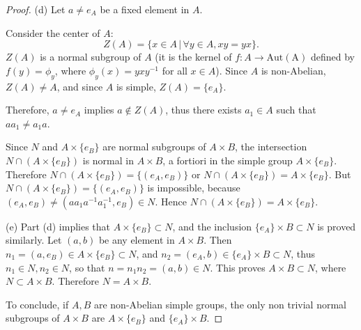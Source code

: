 \documentclass[11pt,a4paper]{article}
\begin{document}
\begin{proof}
\item[(d)] Let $a\ne e_A$ be a fixed element in $A$.

Consider the center of $A$:
$$Z(A) = \{x \in A\, | \, \forall y \in A, xy = yx\}.$$
$Z(A)$ is a normal subgroup of $A$ (it is the kernel of $f : A \to \mathrm{Aut(A)}$ defined by $f(y) =\phi_y$, where $\phi_y(x) = yxy^{-1}$ for all $x\in A$). Since $A$ is non-Abelian, $Z(A) \ne A$, and since $A$ is simple, $Z(A) = \{e_A\}$.

Therefore, $a\ne e_A$ implies $a \not \in Z(A)$, thus there exists $a_1 \in A$ such that $aa_1 \ne a_1 a$.

Since $N$ and $A\times \{e_B\}$ are normal subgroups of $A\times B$, the intersection $N \cap (A\times \{e_B\})$ is normal in $A\times B$, a fortiori in the simple group $A\times \{e_B\}$. Therefore  $N \cap (A\times \{e_B\}) =\{(e_A,e_B)\}$ or $N \cap (A\times \{e_B\}) = A \times \{e_B\}$. But $N \cap (A\times \{e_B\}) =\{(e_A,e_B)\}$ is impossible, because $(e_A,e_B) \ne (aa_1a^{-1}a_1^{-1}, e_B) \in N$. Hence $N \cap (A\times \{e_B\}) = A \times \{e_B\}$.

\item[(e)] Part (d) implies that $A \times \{e_B\} \subset N$, and the inclusion $\{e_A\} \times B \subset N$ is proved similarly. Let $(a,b)$ be any element in $A\times B$. Then 
$n_1 = (a,e_B) \in A\times\{e_B\} \subset N$, and $n_2 = (e_A,b) \in \{e_A\} \times B \subset N$, thus $n_1 \in N, n_2 \in N$, so that $n =n_1n_2 = (a,b) \in N$. This proves $A\times B \subset N$, where $N \subset A\times B$. Therefore $N = A \times B$.

To conclude, if $A,B$ are non-Abelian simple groups, the only non trivial normal subgroups of $A\times B$ are $A \times \{e_B\}$ and $\{e_A\} \times B$.
\end{proof}
























 
\end{document}
